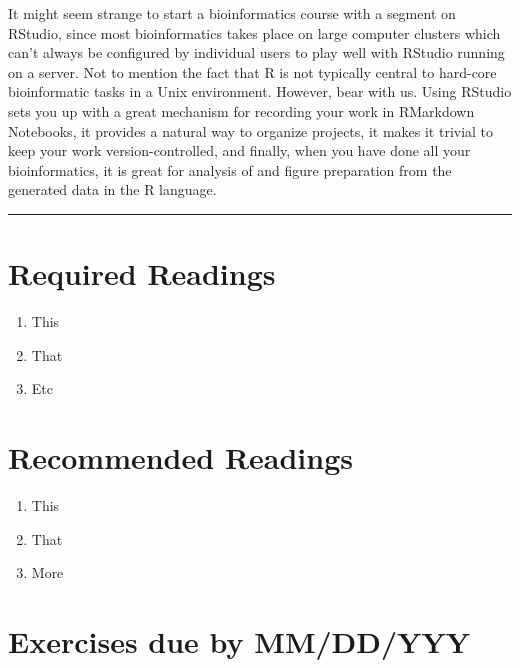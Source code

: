\documentclass[]{book}
\providecommand{\tightlist}{%
  \setlength{\itemsep}{0pt}\setlength{\parskip}{0pt}}
\begin{document}
It might seem strange to start a bioinformatics course with a segment
on RStudio, since most bioinformatics takes place on large computer
clusters which can't always be configured by individual users to
play well with RStudio running on a server. Not to mention the fact that
R is not typically central to hard-core bioinformatic tasks in a
Unix environment. However, bear with us. Using RStudio sets you up
with a great mechanism for recording your work in RMarkdown Notebooks,
it provides a natural way to organize projects, it makes it trivial
to keep your work version-controlled, and finally, when you have done
all your bioinformatics, it is great for analysis of and figure preparation from
the generated data in the R language.

\begin{center}\rule{0.5\linewidth}{\linethickness}\end{center}

\hypertarget{required-readings}{%
\section*{Required Readings}\label{required-readings}}

\begin{enumerate}
\def\labelenumi{\arabic{enumi}.}
\tightlist
\item
  This
\item
  That
\item
  Etc
\end{enumerate}

\hypertarget{recommended-readings}{%
\section*{Recommended Readings}\label{recommended-readings}}

\begin{enumerate}
\def\labelenumi{\arabic{enumi}.}
\tightlist
\item
  This
\item
  That
\item
  More
\end{enumerate}

\hypertarget{exercises-due-by-mmddyyy}{%
\section*{Exercises due by MM/DD/YYY}\label{exercises-due-by-mmddyyy}}
\end{document}
